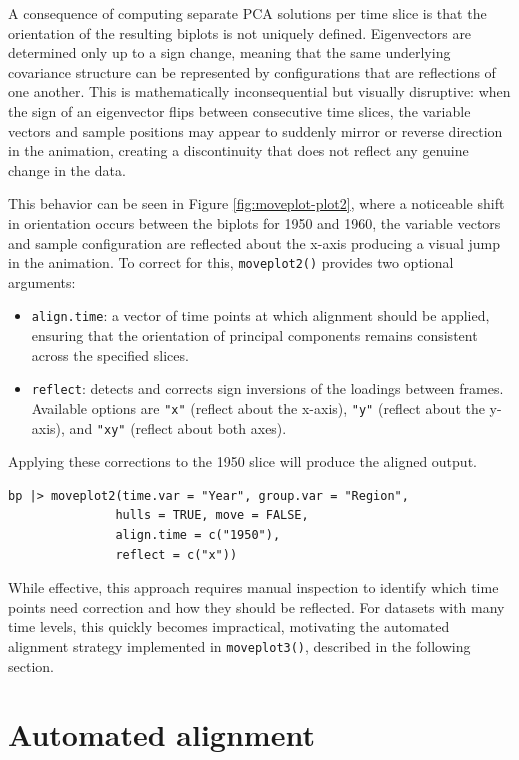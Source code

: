 A consequence of computing separate PCA solutions per time slice is that the orientation of the resulting biplots is not uniquely defined. Eigenvectors are determined only up to a sign change, meaning that the same underlying covariance structure can be represented by configurations that are reflections of one another. This is mathematically inconsequential but visually disruptive: when the sign of an eigenvector flips between consecutive time slices, the variable vectors and sample positions may appear to suddenly mirror or reverse direction in the animation, creating a discontinuity that does not reflect any genuine change in the data.

This behavior can be seen in Figure \ref{fig:moveplot-plot2}, where a noticeable shift in orientation occurs between the biplots for 1950 and 1960, the variable vectors and sample configuration are reflected about the x-axis producing a visual jump in the animation. To correct for this, \texttt{moveplot2()} provides two optional arguments:

\begin{itemize}
\tightlist
\item
  \texttt{align.time}: a vector of time points at which alignment should be applied, ensuring that the orientation of principal components remains consistent across the specified slices.
\item
  \texttt{reflect}: detects and corrects sign inversions of the loadings between frames. Available options are \texttt{"x"} (reflect about the x-axis), \texttt{"y"} (reflect about the y-axis), and \texttt{"xy"} (reflect about both axes).
\end{itemize}

Applying these corrections to the 1950 slice will produce the aligned output.

\begin{verbatim}
bp |> moveplot2(time.var = "Year", group.var = "Region", 
               hulls = TRUE, move = FALSE,
               align.time = c("1950"),
               reflect = c("x"))
\end{verbatim}

While effective, this approach requires manual inspection to identify which time points need correction and how they should be reflected. For datasets with many time levels, this quickly becomes impractical, motivating the automated alignment strategy implemented in \texttt{moveplot3()}, described in the following section.

\section{Automated alignment}\label{automated-alignment}

